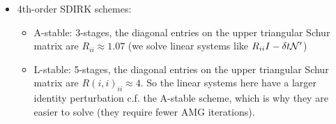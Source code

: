 \documentclass[review]{siamart}
\begin{document}
\begin{itemize}
\item 4th-order SDIRK schemes:
\begin{itemize}
\setlength\itemsep{0.5em}
\item A-stable: 3-stages, the diagonal entries on the upper triangular Schur matrix are $R_{ii} \approx 1.07$ (we solve linear systems like $R_{ii} I - \delta t {\cal N}'$)

\item L-stable: 5-stages, the diagonal entries on the upper triangular Schur matrix are $R(i,i)_{ii} \approx 4$. So the linear systems here have a larger identity perturbation c.f. the A-stable scheme, which is why they are easier to solve (they require fewer AMG iterations). 
\end{itemize}

\end{itemize}
\end{document}
